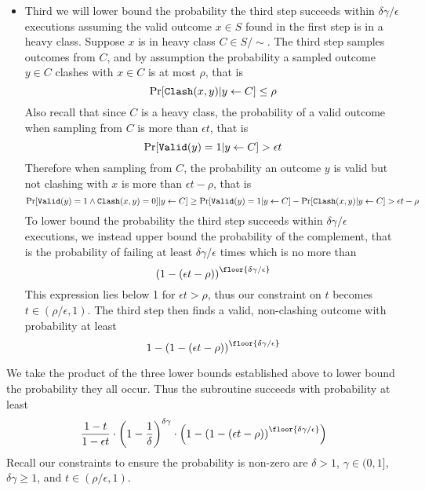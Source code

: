\begin{itemize}
    \item
    Third we will lower bound the probability the third step succeeds within $\delta\gamma/\epsilon$ executions assuming the valid outcome $x\in S$ found in the first step is in a heavy class.
    Suppose $x$ is in heavy class $C\in S/\sim$.
    The third step samples outcomes from $C$, and by assumption the probability a sampled outcome $y\in C$ clashes with $x\in C$ is at most $\rho$, that is
    \begin{equation}
        \Pr[\mathtt{Clash}(x,y)|y\leftarrow C] \leq \rho
    \end{equation}
    Also recall that since $C$ is a heavy class, the probability of a valid outcome when sampling from $C$ is more than $\epsilon t$, that is
    \begin{equation}
        \Pr[\mathtt{Valid}(y)=1|y\leftarrow C] > \epsilon t
    \end{equation}
    Therefore when sampling from $C$, the probability an outcome $y$ is valid but not clashing with $x$ is more than $\epsilon t - \rho$, that is
    \begin{equation}
        \Pr[\mathtt{Valid}(y)=1\land\mathtt{Clash}(x,y)=0]|y\leftarrow C]
        \geq \Pr[\mathtt{Valid}(y)=1|y\leftarrow C] - \Pr[\mathtt{Clash}(x,y)|y\leftarrow C]
        > \epsilon t - \rho
    \end{equation}
    To lower bound the probability the third step succeeds within $\delta\gamma/\epsilon$ executions, we instead upper bound the probability of the complement, that is the probability of failing at least $\delta\gamma/\epsilon$ times which is no more than
    \begin{equation}
        \left(1 - (\epsilon t - \rho)\right)^\floor{\delta\gamma/\epsilon}
    \end{equation}
    This expression lies below 1 for $\epsilon t > \rho$, thus our constraint on $t$ becomes $t\in(\rho/\epsilon,1)$.
    The third step then finds a valid, non-clashing outcome with probability at least
    \begin{equation}
        1 - \left(1 - (\epsilon t - \rho)\right)^\floor{\delta\gamma/\epsilon}
    \end{equation}
\end{itemize}

We take the product of the three lower bounds established above to lower bound the probability they all occur.
Thus the subroutine succeeds with probability at least
\begin{equation}
    \frac{1-t}{1-\epsilon t}\cdot
    \left(1-\frac{1}{\delta}\right)^{\delta\gamma}\cdot
    \left(1 - \left(1 - (\epsilon t - \rho)\right)^\floor{\delta\gamma/\epsilon}\right)
\end{equation}
Recall our constraints to ensure the probability is non-zero are $\delta > 1$, $\gamma\in(0,1]$, $\delta\gamma\geq1$, and $t\in(\rho/\epsilon,1)$.

